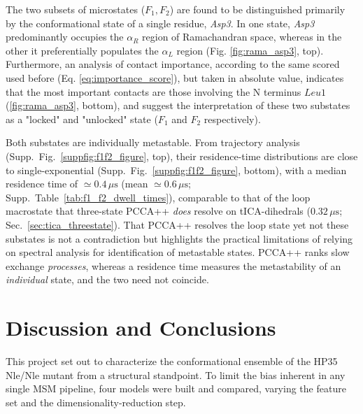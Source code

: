 \documentclass[prl,twocolumn]{revtex4-1}
\begin{document}
The two subsets of microstates ($F_1, F_2$) are found to be distinguished primarily by the conformational state of a single residue, \textit{Asp3}. In one state, \textit{Asp3} predominantly occupies the $\alpha_R$ region of Ramachandran space, whereas in the other it preferentially populates the $\alpha_L$ region (Fig. \ref{fig:rama_asp3}, top). Furthermore, an analysis of contact importance, according to the same scored used before (Eq. \ref{eq:importance_score}), but taken in absolute value, indicates that the most important contacts are those involving the N terminus $Leu1$ (\ref{fig:rama_asp3}, bottom), and suggest the interpretation of these two substates as a "locked" and "unlocked" state ($F_1$ and $F_2$ respectively).

Both substates are individually metastable. From trajectory analysis (Supp.~Fig.~\ref{suppfig:f1f2_figure}, top), their residence-time distributions are close to single-exponential (Supp.~Fig.~\ref{suppfig:f1f2_figure}, bottom),  with a median residence time of $\simeq 0.4\,\mu\mathrm{s}$ (mean $\simeq 0.6\,\mu\mathrm{s}$; Supp.~Table~\ref{tab:f1_f2_dwell_times}), comparable to that of the loop macrostate that three-state PCCA++ \emph{does} resolve on tICA-dihedrals ($0.32\,\mu\mathrm{s}$; Sec.~\ref{sec:tica_threestate}). 
That PCCA++ resolves the loop state yet not these substates is not a contradiction but highlights the practical limitations of relying on spectral analysis for identification of metastable states. PCCA++ ranks slow exchange \emph{processes}, whereas a residence time measures the metastability of an \emph{individual} state, and the two need not coincide.
%
%
%
%
%
%
%
%
%
\section{Discussion and Conclusions}

This project set out to characterize the conformational ensemble of the HP35 Nle/Nle mutant from a structural standpoint. To limit the bias inherent in any single MSM pipeline, four models were built and compared, varying the feature set and the dimensionality-reduction step.
\end{document}
